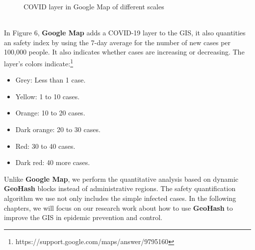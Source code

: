 \documentclass[sigplan,screen]{acmart}
\begin{document}
\begin{figure}[htb]
	\centering
	\caption{COVID layer in Google Map of different scales}
\end{figure}
\\
In Figure 6, \textbf{Google Map} adds a COVID-19 layer to the GIS, it also quantities an safety index by using the 7-day average for the number of new cases per 100,000 people.
It also indicates whether cases are increasing or decreasing.
The layer's colors indicate:\footnote{https://support.google.com/maps/answer/9795160}
\begin{itemize}
	\item Grey: Less than 1 case.
	\item Yellow: 1 to 10 cases.
	\item Orange: 10 to 20 cases.
	\item Dark orange: 20 to 30 cases.
	\item Red: 30 to 40 cases.
	\item Dark red: 40 more cases.
\end{itemize}
Unlike \textbf{Google Map}, we perform the quantitative analysis based on dynamic \textbf{GeoHash} blocks instead of administrative regions.
The safety quantification algorithm we use not only includes the simple infected cases.
In the following chapters, we will focus on our research work about how to use \textbf{GeoHash} to improve the GIS in epidemic prevention and control.
\end{document}
